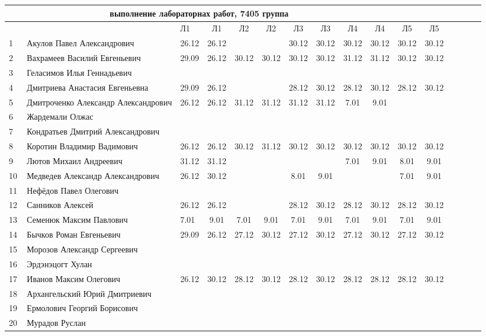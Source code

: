 \documentclass[a4paper,landscape,11pt]{article}
\begin{document}
\newpage
%
\hspace{-4.1cm} %
\begin{tabular}{l|llccccccccccccc}
\multicolumn{10}{c}{выполнение лабораторнах работ, 7405 группа} \\
\toprule
&&Л1&Л1& Л2&Л2& Л3&Л3& Л4&Л4&Л5&Л5\\
\midrule
1\,& Акулов Павел Александрович            &26.12& 26.12&      &      & 30.12& 30.12& 30.12& 30.12& 30.12& 30.12\\
2\,& Вахрамеев Василий Евгеньевич          &29.09& 26.12& 30.12& 30.12& 30.12& 30.12& 31.12& 31.12& 30.12& 30.12\\
3\,& Геласимов Илья Геннадьевич            &&&&&&&&\\
4\,& Дмитриева Анастасия Евгеньевна        &29.09& 26.12&      &      & 28.12& 30.12& 28.12& 30.12& 28.12& 30.12\\
5\,& Дмитроченко Александр Александрович   &26.12& 26.12& 31.12& 31.12& 31.12& 31.12&  7.01&  9.01\\
\midrule
6\,& Жардемали Олжас   &&&&&&&&\\
7\,& Кондратьев Дмитрий Александрович      &&&&&&&&\\
8\,& Коротин Владимир Вадимович            &26.12& 26.12& 30.12& 31.12& 30.12& 30.12& 30.12& 30.12& 30.12& 30.12\\
9\,& Лютов Михаил Андреевич                &31.12&31.12&       &      &      &      &  7.01&  9.01&  8.01&  9.01&\\
10\,&Медведев Александр Александрович      &26.12& 30.12&      &      &  8.01&  9.01&      &      &  7.01&  9.01\\
\midrule
11\,&Нефёдов Павел Олегович                &&&&&&&&\\
12\,&Санников Алексей                      &26.12& 26.12&      &      & 28.12& 30.12& 28.12& 30.12& 28.12& 30.12\\
13\,&Семенюк Максим Павлович               & 7.01&  9.01&  7.01&  9.01&  7.01&  9.01&  7.01&  9.01&  7.01&  9.01\\
14\,&Бычков Роман Евгеньевич               &29.09& 26.12& 27.12& 30.12& 27.12& 30.12& 27.12& 30.12& 27.12& 30.12\\
15\,&Морозов Александр Сергеевич           &&&&&&&&\\
\midrule
16\,&Эрдэнэцогт Хулан                      &&&&&&&&\\
17\,&Иванов Максим Олегович                &26.12& 30.12& 28.12& 30.12& 28.12& 30.12& 28.12& 28.12& 28.12& 30.12\\
18\,&Архангельский Юрий Дмитриевич         &&&&&&&&\\ 
19\,&Ермолович Георгий Борисович           &&&&&&&&\\
20\,& Мурадов Руслан                       &&&&&&&&\\
\bottomrule
\end{tabular}
\end{document}
